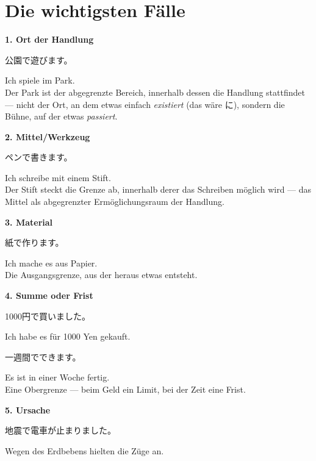 \documentclass[12pt]{book}
\begin{document}
\section*{Die wichtigsten Fälle}

\textbf{1. Ort der Handlung}
\par\quad 公園で遊びます。\\
\par\quad Ich spiele im Park.\\

Der Park ist der abgegrenzte Bereich, innerhalb dessen die Handlung stattfindet — nicht der Ort, an dem etwas einfach \emph{existiert} (das wäre に), sondern die Bühne, auf der etwas \emph{passiert}.

\textbf{2. Mittel/Werkzeug}
\par\quad ペンで書きます。\\
\par\quad Ich schreibe mit einem Stift.\\

Der Stift steckt die Grenze ab, innerhalb derer das Schreiben möglich wird — das Mittel als abgegrenzter Ermöglichungsraum der Handlung.

\textbf{3. Material}
\par\quad 紙で作ります。\\
\par\quad Ich mache es aus Papier.\\

Die Ausgangsgrenze, aus der heraus etwas entsteht.

\textbf{4. Summe oder Frist}
\par\quad 1000円で買いました。\\
\par\quad Ich habe es für 1000 Yen gekauft.\\

\par\quad 一週間でできます。\\
\par\quad Es ist in einer Woche fertig.\\

Eine Obergrenze — beim Geld ein Limit, bei der Zeit eine Frist.

\textbf{5. Ursache}
\par\quad 地震で電車が止まりました。\\
\par\quad Wegen des Erdbebens hielten die Züge an.\\
\end{document}
